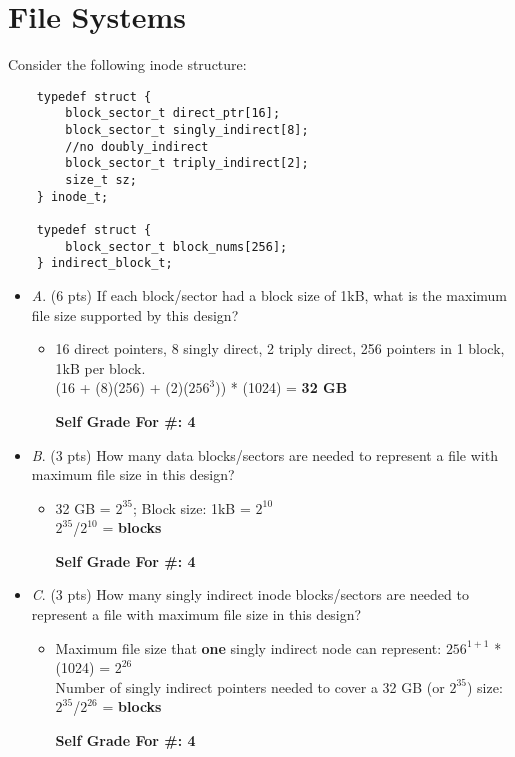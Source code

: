 \documentclass[conference]{IEEEtran}
\begin{document}
\section{File Systems}
Consider the following inode structure:
\begin{lstlisting}
    typedef struct {
        block_sector_t direct_ptr[16];
        block_sector_t singly_indirect[8];
        //no doubly_indirect
        block_sector_t triply_indirect[2];
        size_t sz;
    } inode_t;

    typedef struct {
	    block_sector_t block_nums[256];
    } indirect_block_t;
\end{lstlisting}

\begin{itemize}
\item \textit{A}. (6 pts) If each block/sector had a block size of 1kB, what is the maximum file size
supported by this design?
\begin{itemize} 
	\item 16 direct pointers, 8 singly direct, 2 triply direct, 256 pointers in 1 block, 1kB per block. \\
	(16 + (8)(256) + (2)($256^{3}$)) * (1024) = \textbf{32 GB}
	\begin{center}
		\textbf{Self Grade For \#: 4}
		\end{center}
\end{itemize}
\end{itemize}

\begin{itemize}
	\item \textit{B}. (3 pts) How many data blocks/sectors are needed to represent a file with maximum file size
		in this design?
	\begin{itemize} 
		\item 32 GB = $2^{35}$; Block size: 1kB = $2^{10}$ \\
		 $2^{35}$/$2^{10}$ =  \textbf{blocks} 
		 \begin{center}
		 	\textbf{Self Grade For \#: 4}
		 \end{center}
	\end{itemize}
\end{itemize}

\begin{itemize}
	\item \textit{C}. (3 pts) How many singly indirect inode blocks/sectors are needed to represent a file with
		maximum file size in this design?
	\begin{itemize} 
		\item Maximum file size that \textbf{one} singly indirect node can represent: $256^{1+1}$ * (1024) = $2^{26}$ \\
		Number of singly indirect pointers needed to cover a 32 GB (or $2^{35}$) size: $2^{35}$/$2^{26}$ =  \textbf{blocks}
		\begin{center}
			\textbf{Self Grade For \#: 4}
		\end{center}
	\end{itemize}
\end{itemize}
\end{document}
